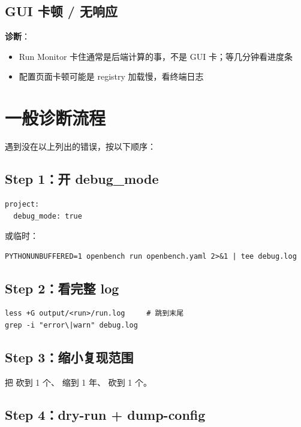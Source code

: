 \subsection{GUI 卡顿 / 无响应}

\textbf{诊断}：

\begin{itemize}
  \item Run Monitor 卡住通常是后端计算的事，不是 GUI 卡；等几分钟看进度条
  \item 配置页面卡顿可能是 registry 加载慢，看终端日志
\end{itemize}

\section{一般诊断流程}

遇到没在以上列出的错误，按以下顺序：

\subsection{Step 1：开 debug\_mode}

\begin{verbatim}
project:
  debug_mode: true
\end{verbatim}

或临时：

\begin{verbatim}
PYTHONUNBUFFERED=1 openbench run openbench.yaml 2>&1 | tee debug.log
\end{verbatim}

\subsection{Step 2：看完整 log}

\begin{verbatim}
less +G output/<run>/run.log     # 跳到末尾
grep -i "error\|warn" debug.log
\end{verbatim}

\subsection{Step 3：缩小复现范围}

把  砍到 1 个、 缩到 1 年、 砍到 1 个。

\subsection{Step 4：dry-run + dump-config}

